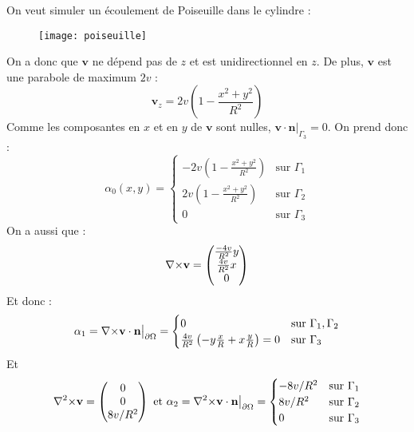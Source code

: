 On veut simuler un écoulement de Poiseuille dans le cylindre :
\begin{figure}[H]
\centering
\texttt{[image: poiseuille]}
\end{figure}
 On a donc que $\mathbf{v}$ ne dépend pas de $z$ et est unidirectionnel en $z$. De plus, $\mathbf{v}$ est une parabole de maximum $2v$ : \[ \mathbf{v}_z=2v\left(1-\frac{x^2+y^2}{R^2}\right)\]
Comme les composantes en $x$ et en $y$ de $\mathbf{v}$ sont nulles, $\mathbf{v}\cdot\mathbf{n}\big\rvert_{\Gamma_3}=0$. On prend donc :
\begin{equation}\label{alpha0}
 \alpha_0(x,y)= \begin{cases} -2v\left(1-\frac{x^2+y^2}{R^2}\right) &\mbox{sur } \Gamma_1\\
2v\left(1-\frac{x^2+y^2}{R^2}\right)&\mbox{sur } \Gamma_2\\
0 &\mbox{sur } \Gamma_3 \end{cases} \end{equation}
On a aussi que :
\[ {\nabla\times}\mathbf{v} = \begin{pmatrix}\frac{-4v}{R^2}y\\\frac{4v}{R^2}x\\0\end{pmatrix}\]
Et donc :\[\alpha_1={\nabla\times}\mathbf{v}\cdot\mathbf{n}{\big\rvert_{\partial\Omega}} = \begin{cases} 0 &\mbox{sur } \Gamma_1,\Gamma_2\\
\frac{4v}{R^2}\left(-y\frac{x}{R} + x\frac{y}{R}\right) = 0 &\mbox{sur } \Gamma_3 \end{cases} \]
Et
\[ {\nabla^2\times}\mathbf{v} = \begin{pmatrix}0\\0\\8v/R^2\end{pmatrix}\mbox{ et } \alpha_2={\nabla^2\times}\mathbf{v}\cdot\mathbf{n}{\big\rvert_{\partial\Omega}} = \begin{cases} -8v/R^2 &\mbox{sur } \Gamma_1\\
8v/R^2 &\mbox{sur } \Gamma_2\\ 0 &\mbox{sur } \Gamma_3 \end{cases} \]

